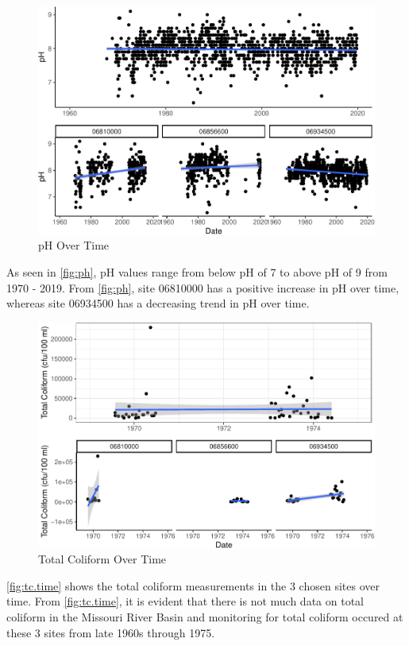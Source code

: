 \documentclass[12pt,]{article}
\begin{document}
\begin{figure}
\centering
\includegraphics{Project_Template_files/figure-latex/ph-1.pdf}
\caption{\label{fig:ph}pH Over Time}
\end{figure}

As seen in \autoref{fig:ph}, pH values range from below pH of 7 to above
pH of 9 from 1970 - 2019. From \autoref{fig:ph}, site 06810000 has a
positive increase in pH over time, whereas site 06934500 has a
decreasing trend in pH over time.

\begin{figure}
\centering
\includegraphics{Project_Template_files/figure-latex/tc.time-1.pdf}
\caption{\label{fig:tc.time}Total Coliform Over Time}
\end{figure}

\autoref{fig:tc.time} shows the total coliform measurements in the 3
chosen sites over time. From \autoref{fig:tc.time}, it is evident that
there is not much data on total coliform in the Missouri River Basin and
monitoring for total coliform occured at these 3 sites from late 1960s
through 1975.
\end{document}
